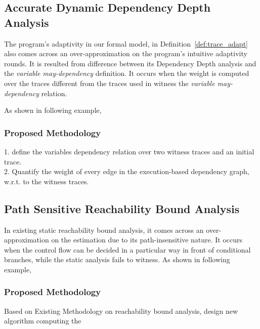 \subsection{Accurate Dynamic Dependency Depth Analysis}
\label{subsec:furthers-dep-depth}
%
The program's adaptivity in our formal model,
in Definition~\ref{def:trace_adapt} also
 comes across an over-approximation on the program's
 intuitive adaptivity rounds.
It is resulted from difference between its Dependency Depth analysis and the \emph{variable may-dependency} definition.
It occurs when the weight is computed over the traces different from the traces used in 
witness the \emph{variable may-dependency} relation.

As shown in following example, 


% 
\subsubsection{Proposed Methodology}
\label{subsubsec:furthers-dep-depth}
% 
1. define the variables dependency relation over two witness traces and an initial trace.
\\
2. Quantify the weight of every edge in the execution-based dependency graph, w.r.t. to the witness traces.
\\

\subsection{Path Sensitive Reachability Bound Analysis}
\label{subsec:furthers-reachability}
In existing static reachability bound analysis, 
it comes across an over-approximation on the estimation due to its path-insensitive nature. 
It occurs when the control flow can be decided in a particular way in front of conditional branches, 
while the static analysis fails to witness. 
As shown in following example, 


\subsubsection{Proposed Methodology}
\label{subsubsec:furthers-reachability}
Based on Existing Methodology on reachability bound analysis, design new algorithm computing the 


